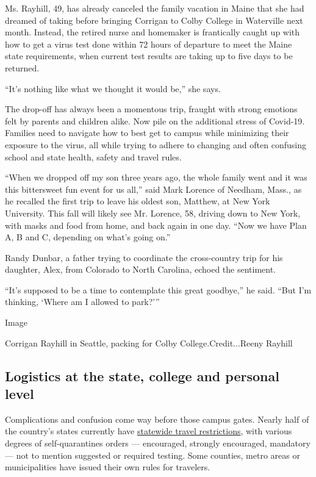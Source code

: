 Ms. Rayhill, 49, has already canceled the family vacation in Maine that
she had dreamed of taking before bringing Corrigan to Colby College in
Waterville next month. Instead, the retired nurse and homemaker is
frantically caught up with how to get a virus test done within 72 hours
of departure to meet the Maine state requirements, when current test
results are taking up to five days to be returned.

``It's nothing like what we thought it would be,'' she says.

The drop-off has always been a momentous trip, fraught with strong
emotions felt by parents and children alike. Now pile on the additional
stress of Covid-19. Families need to navigate how to best get to campus
while minimizing their exposure to the virus, all while trying to adhere
to changing and often confusing school and state health, safety and
travel rules.

``When we dropped off my son three years ago, the whole family went and
it was this bittersweet fun event for us all,'' said Mark Lorence of
Needham, Mass., as he recalled the first trip to leave his oldest son,
Matthew, at New York University. This fall will likely see Mr. Lorence,
58, driving down to New York, with masks and food from home, and back
again in one day. ``Now we have Plan A, B and C, depending on what's
going on.''

Randy Dunbar, a father trying to coordinate the cross-country trip for
his daughter, Alex, from Colorado to North Carolina, echoed the
sentiment.

``It's supposed to be a time to contemplate this great goodbye,'' he
said. ``But I'm thinking, `Where am I allowed to park?'''

Image

Corrigan Rayhill in Seattle, packing for Colby College.Credit...Reeny
Rayhill

\hypertarget{logistics-at-the-state-college-and-personal-level}{%
\subsection{Logistics at the state, college and personal
level}\label{logistics-at-the-state-college-and-personal-level}}

Complications and confusion come way before those campus gates. Nearly
half of the country's states currently have
\href{https://www.nytimes.com/2020/07/10/travel/state-travel-restrictions.html}{statewide
travel restrictions}, with various degrees of self-quarantines orders
--- encouraged, strongly encouraged, mandatory --- not to mention
suggested or required testing. Some counties, metro areas or
municipalities have issued their own rules for travelers.

